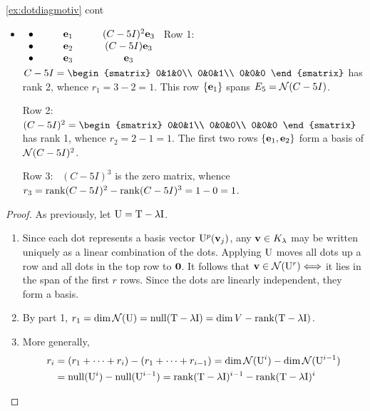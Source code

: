 \begin{example*}{\ref{ex:dotdiagmotiv} cont}{}
\begin{itemize}
		
	\item[$C:$] $\begin{array}[t]{ccc}
		\bullet\\\bullet\\\bullet
		\end{array}
		\qquad
		\begin{array}[t]{c}
		{\mathbf{e}}_1\\
		{\mathbf{e}}_2\\
		{\mathbf{e}}_3
		\end{array}
		\qquad
		\begin{array}[t]{c}
		(C-5I)^2{\mathbf{e}}_3\\
		(C-5I){\mathbf{e}}_3\\
		{\mathbf{e}}_3
		\end{array}$\smallbreak
		Row 1: \ $C-5I=
		\begin{smatrix}
			0&1&0\\
			0&0&1\\
			0&0&0
		\end{smatrix}$
		has rank 2, whence $r_1=3-2=1$. This row $\{{\mathbf{e}}_1\}$ spans $E_5=\mathcal{N}(C-5I)$.\par
		Row 2: \ $(C-5I)^2=
		\begin{smatrix}
			0&0&1\\
			0&0&0\\
			0&0&0
		\end{smatrix}$
		has rank 1, whence $r_2=2-1=1$. The first two rows $\{{\mathbf{e}}_1,{\mathbf{e}}_2\}$ form a basis of $\mathcal{N}(C-5I)^2$.\par
		Row 3: \ $(C-5I)^3$ is the zero matrix, whence $r_3=\operatorname{rank}(C-5I)^2-\operatorname{rank}(C-5I)^3=1-0=1$.
	\end{itemize}
\end{example*}


\begin{proof}
As previously, let $\mathrm{U}=\mathrm{T}-\lambda\mathrm{I}$.
\begin{enumerate}
  \item Since each dot represents a basis vector $\mathrm{U}^p({\mathbf{v}}_j)$, any ${\mathbf{v}}\in K_\lambda$ may be written uniquely as a linear combination of the dots. Applying $\mathrm{U}$ moves all dots up a row and all dots in the top row to $\mathbf{0}$. It follows that ${\mathbf{v}}\in \mathcal{N}(\mathrm{U}^r)\Longleftrightarrow$ it lies in the span of the first $r$ rows. Since the dots are linearly independent, they form a basis.
  \item By part 1, $r_1=\dim \mathcal{N}(\mathrm{U})=\operatorname{null}(\mathrm{T}-\lambda \mathrm{I})=\dim V-\operatorname{rank}(\mathrm{T}-\lambda \mathrm{I})$.
  \item More generally,
  \begin{align*}
  r_i&=(r_1+\cdots+r_i)-(r_1+\cdots +r_{i-1})=\dim\mathcal{N}(\mathrm{U}^i)-\dim \mathcal{N}(\mathrm{U}^{i-1})\\
  &=\operatorname{null}(\mathrm{U}^i)-\operatorname{null}(\mathrm{U}^{i-1})=\operatorname{rank}(\mathrm{T}-\lambda \mathrm{I})^{i-1}-\operatorname{rank}(\mathrm{T}-\lambda \mathrm{I})^{i}\tag*{\qedhere}
  \end{align*}
\end{enumerate}
\end{proof}


